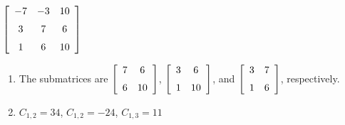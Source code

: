 {$\left[ \begin {array}{ccc} -7&-3&10\\\noalign{\medskip}3&7&6
\\\noalign{\medskip}1&6&10\end {array} \right] $} 
{\begin{enumerate}
\item The submatrices are $\left[ \begin {array}{cc} 7&6\\\noalign{\medskip}6&10\end {array}
 \right] $, $ \left[ \begin {array}{cc} 3&6\\\noalign{\medskip}1&10\end {array} \right] $, and 
 $\left[ \begin {array}{cc} 3&7\\\noalign{\medskip}1&6\end {array}
 \right] $, respectively.
 \item	$C_{1,2}=34$, $C_{1,2}=-24$, $C_{1,3}=11$
 \end{enumerate}
}